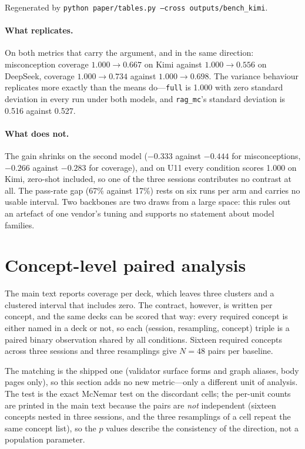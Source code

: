 \documentclass[11pt,a4paper]{article}
\newcommand{\id}[1]{\texttt{#1}}
\begin{document}
Regenerated by \id{python paper/tables.py --cross outputs/bench\_kimi}.

\paragraph{What replicates.} On both metrics that carry the argument, and in the
same direction: misconception coverage $1.000 \to 0.667$ on Kimi against
$1.000 \to 0.556$ on DeepSeek, coverage $1.000 \to 0.734$ against
$1.000 \to 0.698$. The variance behaviour replicates more exactly than the means
do---\id{full} is 1.000 with zero standard deviation in every run under both
models, and \id{rag\_mc}'s standard deviation is 0.516 against 0.527.

\paragraph{What does not.} The gain shrinks on the second model ($-0.333$ against
$-0.444$ for misconceptions, $-0.266$ against $-0.283$ for coverage), and on U11
every condition scores 1.000 on Kimi, zero-shot included, so one of the three
sessions contributes no contrast at all. The pass-rate gap (67\% against 17\%)
rests on six runs per arm and carries no usable interval. Two backbones are two
draws from a large space: this rules out an artefact of one vendor's tuning and
supports no statement about model families.

\section{Concept-level paired analysis}
\label{sec:s5}

The main text reports coverage per deck, which leaves three clusters and a
clustered interval that includes zero. The contract, however, is written per
concept, and the same decks can be scored that way: every required concept is
either named in a deck or not, so each (session, resampling, concept) triple is a
paired binary observation shared by all conditions. Sixteen required concepts
across three sessions and three resamplings give $N=48$ pairs per baseline.

The matching is the shipped one (validator surface forms and graph aliases, body
pages only), so this section adds no new metric---only a different unit of
analysis. The test is the exact McNemar test on the discordant cells; the
per-unit counts are printed in the main text because the pairs are \emph{not}
independent (sixteen concepts nested in three sessions, and the three resamplings
of a cell repeat the same concept list), so the $p$ values describe the
consistency of the direction, not a population parameter.
\end{document}
